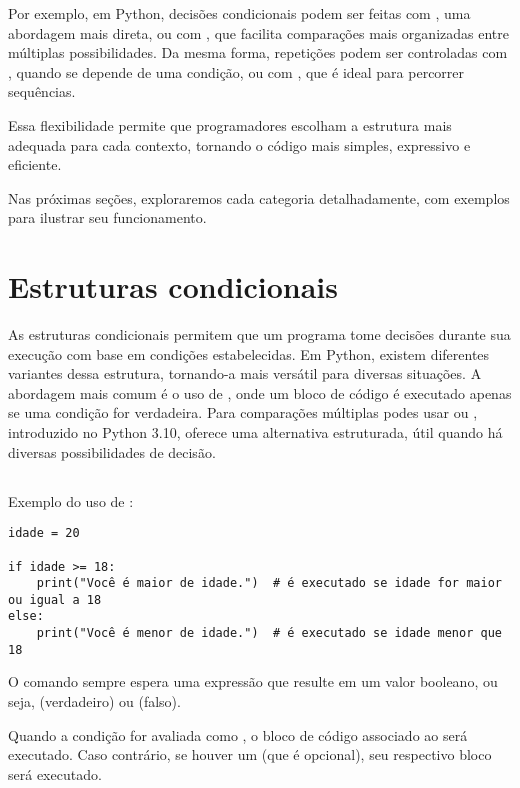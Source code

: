Por exemplo, em Python, decisões condicionais podem ser feitas com , uma abordagem mais direta, ou
com , que facilita comparações mais organizadas entre múltiplas possibilidades.
Da mesma forma, repetições podem ser controladas com , quando se depende de uma condição, ou
com , que é ideal para percorrer sequências.

Essa flexibilidade permite que programadores escolham a estrutura mais adequada para cada contexto, tornando o
código mais simples, expressivo e eficiente.

Nas próximas seções, exploraremos cada categoria detalhadamente, com exemplos para ilustrar seu funcionamento.



\section{Estruturas condicionais}\label{if}
As estruturas condicionais permitem que um programa tome decisões durante sua execução com base em condições
estabelecidas.
Em Python, existem diferentes variantes dessa estrutura, tornando-a mais versátil para diversas situações.
A abordagem mais comum é o uso de , onde um bloco de código é executado apenas se uma condição for
verdadeira.
Para comparações múltiplas podes usar  ou ,
introduzido no Python 3.10, oferece uma alternativa estruturada, útil quando há diversas possibilidades de decisão.


\subsection{}
Exemplo do uso de :
\begin{verbatim}
idade = 20

if idade >= 18:
    print("Você é maior de idade.")  # é executado se idade for maior ou igual a 18
else:
    print("Você é menor de idade.")  # é executado se idade menor que 18
\end{verbatim}

O comando  sempre espera uma expressão que resulte em um valor booleano,
ou seja,  (verdadeiro) ou  (falso).

Quando a condição for avaliada como , o bloco de código associado ao  será executado.
Caso contrário, se houver um  (que é opcional), seu respectivo bloco será executado.

